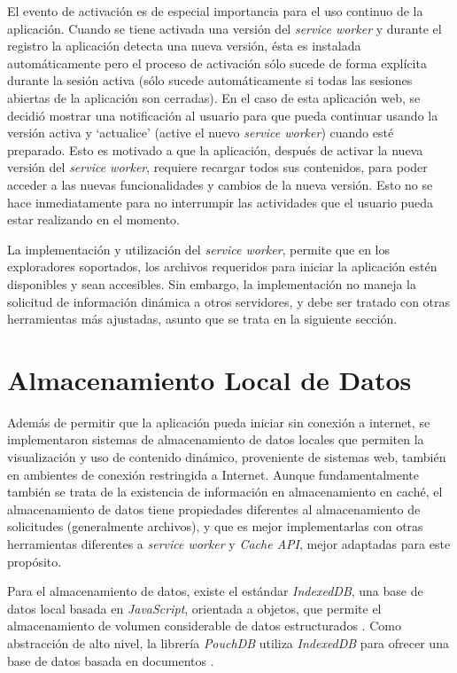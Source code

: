 El evento de activación es de especial importancia para el uso continuo de la aplicación. Cuando se tiene activada una versión del \textit{service worker} y durante el registro la aplicación detecta una nueva versión, ésta es instalada automáticamente pero el proceso de activación sólo sucede de forma explícita durante la sesión activa (sólo sucede automáticamente si todas las sesiones abiertas de la aplicación son cerradas). En el caso de esta aplicación web, se decidió mostrar una notificación al usuario para que pueda continuar usando la versión activa y ‘actualice’ (active el nuevo \textit{service worker}) cuando esté preparado. Esto es motivado a que la aplicación, después de activar la nueva versión del \textit{service worker}, requiere recargar todos sus contenidos, para poder acceder a las nuevas funcionalidades y cambios de la nueva versión. Esto no se hace inmediatamente para no interrumpir las actividades que el usuario pueda estar realizando en el momento.

La implementación y utilización del \textit{service worker}, permite que en los exploradores soportados, los archivos requeridos para iniciar la aplicación estén disponibles y sean accesibles. Sin embargo, la implementación no maneja la solicitud de información dinámica a otros servidores, y debe ser tratado con otras herramientas más ajustadas, asunto que se trata en la siguiente sección.

\section{Almacenamiento Local de Datos}

Además de permitir que la aplicación pueda iniciar sin conexión a internet, se implementaron sistemas de almacenamiento de datos locales que permiten la visualización y uso de contenido dinámico, proveniente de sistemas web, también en ambientes de conexión restringida a Internet. Aunque fundamentalmente también se trata de la existencia de información en almacenamiento en caché, el almacenamiento de datos tiene propiedades diferentes al almacenamiento de solicitudes (generalmente archivos), y que es mejor implementarlas con otras herramientas diferentes a \textit{service worker} y \textit{Cache API}, mejor adaptadas para este propósito.

Para el almacenamiento de datos, existe el estándar \textit{IndexedDB}, una base de datos local basada en \textit{JavaScript}, orientada a objetos, que permite el almacenamiento de volumen considerable de datos estructurados \cite{indexeddb}. Como abstracción de alto nivel, la librería \textit{PouchDB} utiliza \textit{IndexedDB} para ofrecer una base de datos basada en documentos \cite{pouchdb}.

